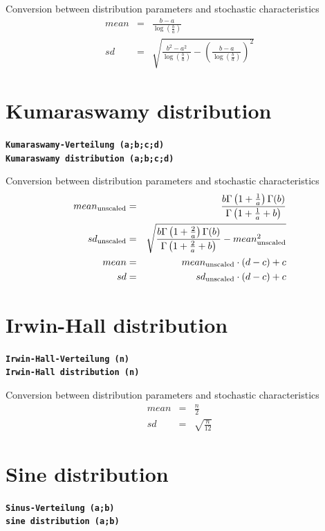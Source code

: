 \documentclass{svmono}
\def\cm#1{\textbf{\texttt{#1}}}
\begin{document}
Conversion between distribution parameters and stochastic characteristics
\begin{eqnarray*}
mean&=&\frac{b-a}{\log\left(\frac{b}{a}\right)}\\
sd&=&\sqrt{\frac{b^2-a^2}{\log\left(\frac{b}{a}\right)}-\left(\frac{b-a}{\log\left(\frac{b}{a}\right)}\right)^2}
\end{eqnarray*}





\section*{Kumaraswamy distribution}
\cm{Kumaraswamy-Verteilung (a;b;c;d)}~\\
\cm{Kumaraswamy distribution (a;b;c;d)}

Conversion between distribution parameters and stochastic characteristics
\begin{eqnarray*}
mean_{\rm unscaled}&=&\frac{b\Gamma\left(1+\frac{1}{a}\right)\Gamma(b)}{\Gamma\left(1+\frac{1}{a}+b\right)}\\
sd_{\rm unscaled}&=&\sqrt{\frac{b\Gamma\left(1+\frac{2}{a}\right)\Gamma(b)}{\Gamma\left(1+\frac{2}{a}+b\right)}-mean_{\rm unscaled}^2}\\
mean&=&mean_{\rm unscaled}\cdot(d-c)+c\\
sd&=&sd_{\rm unscaled}\cdot(d-c)+c\\
\end{eqnarray*}





\section*{Irwin-Hall distribution}
\cm{Irwin-Hall-Verteilung (n)}~\\
\cm{Irwin-Hall distribution (n)}

Conversion between distribution parameters and stochastic characteristics
\begin{eqnarray*}
mean&=&\frac{n}{2}\\
sd&=&\sqrt{\frac{n}{12}}
\end{eqnarray*}





\section*{Sine distribution}
\cm{Sinus-Verteilung (a;b)}~\\
\cm{sine distribution (a;b)}
\end{document}
